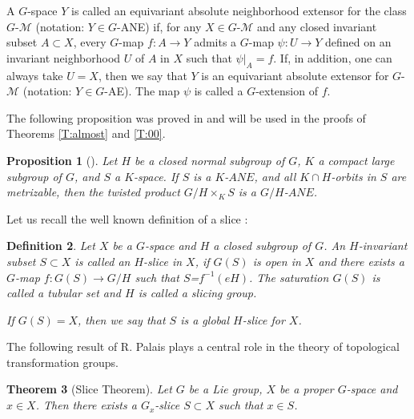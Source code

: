 \documentclass{amsart}
\newtheorem{theorem}{Theorem}[section]
\newtheorem{proposition}[theorem]{Proposition}
\newtheorem{definition}[theorem]{Definition}
\begin{document}
 \smallskip


A $G$-space  $Y$ is called an equivariant absolute neighborhood extensor  for the class  $G$-$\mathcal M$ 
(notation: $Y\in G$-{\rm ANE})  if,   for any  $X\in G$-$\mathcal M$  and any closed invariant subset $A\subset X$, every    $G$-map $f:A\to Y$ admits a $G$-map $\psi\colon U\to Y$ defined on 
  an invariant neighborhood $U$ of $A$ in $X$ such that $\psi|_A= f$. If, in addition, one  can always take $U=X$, then we say that $Y$ is an equivariant absolute extensor  for  $G$-$\mathcal M$ 
  (notation: $Y\in G$-AE). The map $\psi$ is called a $G$-extension of $f$.

\medskip

The following proposition was proved in \cite[Proposition 3.3]{ant:proper} and will be used in the proofs of Theorems \ref{T:almost} and \ref{T:00}.

\begin{proposition}[\cite{ant:proper}]\label{P:37} Let $H$ be a closed normal subgroup of $G$, $K$   a compact large subgroup of $G$,  and $S$ a $K$-space. If $S$ is a $K$-$ANE$, and all  $K\cap H$-orbits in $S$ are metrizable, then the twisted product $G/H\times_K S$ is a $G/H$-$ANE$.   
\end{proposition}




\smallskip

Let us recall  the well known definition of a slice \cite[p.~305]{pal:61}:

\begin{definition}\label{D:21} Let $X$ be a $G$-space and   $H$   a closed  subgroup of $G$. An $H$-invariant  subset $S\subset X$ is called an  $H$-slice in $X$, if $G(S)$ is open in $X$ and there exists  a $G$-map $f:G(S)\to G/H$ such that $S$=$f^{-1}(eH)$.  The saturation $G(S)$ is  called   a {\it tubular} set and $H$ is called a slicing group. 

  If  $G(S)=X$, then we say that $S$ is {\it a global} $H$-slice for $X$.   
\end{definition}
\medskip

The following  result of R. Palais \cite[Proposition 2.3.1]{pal:61} plays  a central role in the theory of topological transformation groups.

\begin{theorem}[Slice Theorem]\label{T:Sl} Let $G$ be a Lie group, $X$ be a proper $G$-space and $x\in X$. Then there exists a $G_x$-slice $S\subset X$ such that $x\in S$.
\end{theorem}
\end{document}
